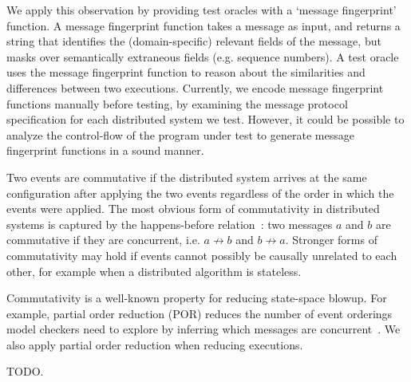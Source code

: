 We apply this observation by providing test oracles with a `message fingerprint' function.
A message fingerprint function takes a message as input,
and returns a string that identifies the (domain-specific) relevant fields of the message, but masks over
semantically extraneous fields (e.g. sequence numbers). A test oracle uses the
message fingerprint function to reason about the similarities and differences
between two executions. Currently, we encode message fingerprint functions
manually before testing, by examining the message protocol specification for each distributed
system we test. However, it could be possible to analyze the control-flow of
the program under test to generate message fingerprint functions in a sound
manner.

 Two events are commutative if the distributed
system arrives at the same configuration after applying the two events
regardless of the order in which the events were applied. The most obvious
form of commutativity in distributed systems is captured by the happens-before
relation~\cite{Lamport:1978:TCO:359545.359563}: two messages $a$ and $b$ are commutative if they are concurrent, i.e.
$a \not\rightarrow b$ and $b \not\rightarrow a$. Stronger forms of
commutativity may hold if events cannot possibly be causally unrelated to each other, for
example when a distributed algorithm is stateless.

Commutativity is a well-known property for reducing state-space
blowup. For example, partial order
reduction (POR) reduces the number of event orderings model checkers need to
explore by inferring which messages are concurrent~\cite{godefroid1995partial,flanagan2005dynamic}.
We also apply partial order reduction when reducing executions.

 TODO.


